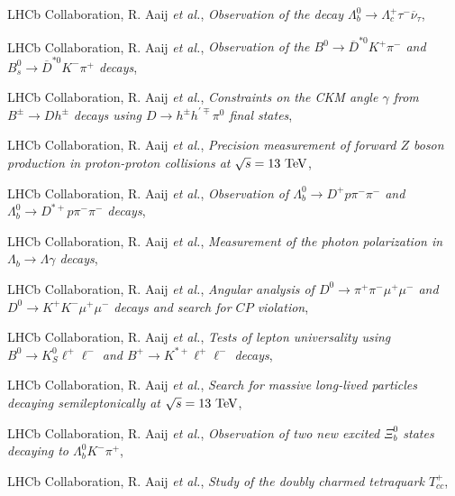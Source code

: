 \begin{cvcontent}
\begin{enumerate}[label={[\arabic*]}, leftmargin=1.5cm]
    \item LHCb Collaboration, R. Aaij \emph{et al.}, 
    \emph{Observation of the decay $\Lambda_b^0 \rightarrow \Lambda_c^+\tau^-\overline{\nu}_{\tau}$},
    \item LHCb Collaboration, R. Aaij \emph{et al.}, 
    \emph{Observation of the $B^0\rightarrow\overline{D}^{*0}K^{+}\pi^{-}$ and $B_s^0\rightarrow\overline{D}^{*0}K^{-}\pi^{+}$ decays},
    \item LHCb Collaboration, R. Aaij \emph{et al.}, 
    \emph{Constraints on the CKM angle $\gamma$ from $B^\pm \rightarrow Dh^\pm$ decays using $D \rightarrow h^\pm h^{\prime\mp}\pi^0$ final states},
    \item LHCb Collaboration, R. Aaij \emph{et al.}, 
    \emph{Precision measurement of forward $Z$ boson production in proton-proton collisions at $\sqrt{s} = 13~\rm{TeV}$},
    \item LHCb Collaboration, R. Aaij \emph{et al.}, 
    \emph{Observation of $\Lambda_b^0\rightarrow D^+ p \pi^-\pi^-$ and $\Lambda_b^0\rightarrow D^{*+} p \pi^-\pi^-$ decays},
    \item LHCb Collaboration, R. Aaij \emph{et al.}, 
    \emph{Measurement of the photon polarization in $\Lambda_b \to \Lambda \gamma$ decays},
    \sloppy
    \item LHCb Collaboration, R. Aaij \emph{et al.}, 
    \emph{Angular analysis of $D^0 \to \pi^+\pi^-\mu^+\mu^-$ and $D^0 \to K^+K^-\mu^+\mu^-$ decays and search for $CP$ violation},
    \item LHCb Collaboration, R. Aaij \emph{et al.}, 
    \emph{Tests of lepton universality using $B^0\to K^0_S \ell^+ \ell^-$ and $B^+\to K^{*+}\ell^+\ell^-$ decays},
    \item LHCb Collaboration, R. Aaij \emph{et al.}, 
    \emph{Search for massive long-lived particles decaying semileptonically at $\sqrt{s} = 13~\rm{TeV}$},
    \item LHCb Collaboration, R. Aaij \emph{et al.}, 
    \emph{Observation of two new excited $\Xi_b^0$ states decaying to  $\Lambda_b^0 K^- \pi^+$}, 
    \sloppy
    \item LHCb Collaboration, R. Aaij \emph{et al.}, 
    \emph{Study of the doubly charmed tetraquark $T_{cc}^+$}, 

\end{enumerate}
\end{cvcontent}
